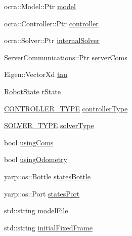 \begin{DoxyCompactItemize}
\item 
ocra\+::\+Model\+::\+Ptr \hyperlink{classocra__recipes_1_1ControllerServer_ab239e92da81b48afa2211ef9b25672f3}{model}
\item 
ocra\+::\+Controller\+::\+Ptr \hyperlink{classocra__recipes_1_1ControllerServer_a8e452bd0a8dce47b6fd289599e7ce210}{controller}
\item 
ocra\+::\+Solver\+::\+Ptr \hyperlink{classocra__recipes_1_1ControllerServer_a46e53b5a5bf9f7d55af477f85cb21522}{internal\+Solver}
\item 
Server\+Communications\+::\+Ptr \hyperlink{classocra__recipes_1_1ControllerServer_af01dc7be410bfebebefedc5f4bb27d1b}{server\+Coms}
\item 
Eigen\+::\+Vector\+Xd \hyperlink{classocra__recipes_1_1ControllerServer_a07e10b62b84a999c14843662a378ec0f}{tau}
\item 
\hyperlink{classocra__recipes_1_1RobotState}{Robot\+State} \hyperlink{classocra__recipes_1_1ControllerServer_a5c565a9ec45e5fad7b56e9a48609ef3d}{r\+State}
\item 
\hyperlink{namespaceocra__recipes_ae561cff4ea9a191b8b1ebb4e69a1a4ba}{C\+O\+N\+T\+R\+O\+L\+L\+E\+R\+\_\+\+T\+Y\+PE} \hyperlink{classocra__recipes_1_1ControllerServer_aaf53114a96960a3cb81577378c179411}{controller\+Type}
\item 
\hyperlink{namespaceocra__recipes_afb3bb4de56c2b9472c80d746eb13fed3}{S\+O\+L\+V\+E\+R\+\_\+\+T\+Y\+PE} \hyperlink{classocra__recipes_1_1ControllerServer_a7c7d1eda2c96085709f0c3a28fd998a4}{solver\+Type}
\item 
bool \hyperlink{classocra__recipes_1_1ControllerServer_a7f7559e938ca0e3cfff4833d86ef5b54}{using\+Coms}
\item 
bool \hyperlink{classocra__recipes_1_1ControllerServer_afd126a8b289e29213468fe9e9a800dd2}{using\+Odometry}
\item 
yarp\+::os\+::\+Bottle \hyperlink{classocra__recipes_1_1ControllerServer_a587f8ef2bc028bf845b1713955def5a1}{states\+Bottle}
\item 
yarp\+::os\+::\+Port \hyperlink{classocra__recipes_1_1ControllerServer_a1d314027131262206280be3e728bf59f}{states\+Port}
\item 
std\+::string \hyperlink{classocra__recipes_1_1ControllerServer_ab077706b924eed4ac5c50e9ade36acf4}{model\+File}
\item 
std\+::string \hyperlink{classocra__recipes_1_1ControllerServer_a93ffe0eff924223989db0ae6fcafaca2}{initial\+Fixed\+Frame}
\end{DoxyCompactItemize}


